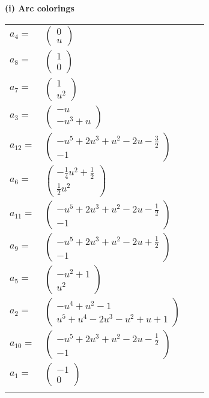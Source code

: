 \documentclass[1p]{elsarticle_modified}
\theoremstyle{definition}
\begin{document}
\flushleft \textbf{(i) Arc colorings}\\
\begin{tabular}{m{7pt} m{180pt} m{7pt} m{180pt} }
\flushright $a_{4}=$&$\begin{pmatrix}0\\u\end{pmatrix}$ \\
\flushright $a_{8}=$&$\begin{pmatrix}1\\0\end{pmatrix}$ \\
\flushright $a_{7}=$&$\begin{pmatrix}1\\u^2\end{pmatrix}$ \\
\flushright $a_{3}=$&$\begin{pmatrix}- u\\- u^3+u\end{pmatrix}$ \\
\flushright $a_{12}=$&$\begin{pmatrix}- u^5+2 u^3+u^2-2 u-\frac{3}{2}\\-1\end{pmatrix}$ \\
\flushright $a_{6}=$&$\begin{pmatrix}-\frac{1}{4} u^2+\frac{1}{2}\\\frac{1}{2} u^2\end{pmatrix}$ \\
\flushright $a_{11}=$&$\begin{pmatrix}- u^5+2 u^3+u^2-2 u-\frac{1}{2}\\-1\end{pmatrix}$ \\
\flushright $a_{9}=$&$\begin{pmatrix}- u^5+2 u^3+u^2-2 u+\frac{1}{2}\\-1\end{pmatrix}$ \\
\flushright $a_{5}=$&$\begin{pmatrix}- u^2+1\\u^2\end{pmatrix}$ \\
\flushright $a_{2}=$&$\begin{pmatrix}- u^4+u^2-1\\u^5+u^4-2 u^3- u^2+u+1\end{pmatrix}$ \\
\flushright $a_{10}=$&$\begin{pmatrix}- u^5+2 u^3+u^2-2 u-\frac{1}{2}\\-1\end{pmatrix}$ \\
\flushright $a_{1}=$&$\begin{pmatrix}-1\\0\end{pmatrix}$\\&\end{tabular}
\end{document}
